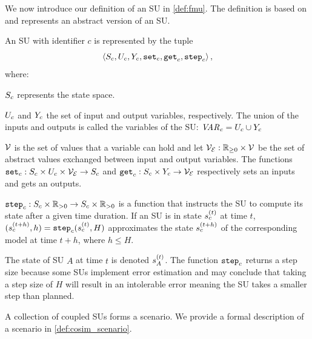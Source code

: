 We now introduce our definition of an SU in \cref{def:fmu}.
The definition is based on \cite{Broman2013,Gomes2019c,thrane2021} and represents an abstract version of an SU.

\begin{definition}\label{def:fmu}
  An SU with identifier $c$ is represented by the tuple
  $$ \left\langle S_{c}, U_{c}, Y_{c}, \mathtt{set}_{c}, \mathtt{get}_{c}, \mathtt{step}_{c} \right\rangle ,$$
  where:
  \begin{compactitem}
    \item $S_{c}$ represents the state space.
    \item $U_{c}$ and $Y_{c}$ the set of input and output variables, respectively.
    The union of the inputs and outputs is called the variables of the SU:
    $\mathit{VAR_{c}} = U_{c} \cup Y_{c}$ 
    \item $\mathcal{V}$ is the set of values that a variable can hold and let $\mathcal{V_{E}}: \mathbb{R}_{\geq 0} \times \mathcal{V}$ be the set of abstract values exchanged between input and output variables.
    The functions
    $\mathtt{set}_{c} : S_{c} \times U_{c} \times \mathcal{V_{E}} \to S_{c}$ and $\mathtt{get}_{c}: S_{c} \times Y_{c} \to \mathcal{V_{E}}$ respectively sets an inputs and gets an outputs. 
    \item $\mathtt{step}_{c}: S_{c} \times \mathbb{R}_{> 0} \to S_{c} \times \mathbb{R}_{> 0} $ is a function that instructs the SU to compute its state after a given time duration. If an SU is in state $s_{c}^{(t)}$ at time $t$, $(s_{c}^{(t+h)}, h) = \mathtt{step}_{c}(s_{c}^{(t)}, H)$ approximates the state $s_{c}^{(t+h)}$ of the corresponding model at time $t+h$, where $h \leq H$. 
  \end{compactitem}
\end{definition}

The state of SU $A$ at time $t$ is denoted $s_{A}^{(t)}$.
The function $\mathtt{step}_{c}$ returns a step size because some SUs implement error estimation and may conclude that taking a step size of $H$ will result in an intolerable error meaning the SU takes a smaller step than planned.

A collection of coupled SUs forms a scenario.
We provide a formal description of a scenario in \cref{def:cosim_scenario}.

